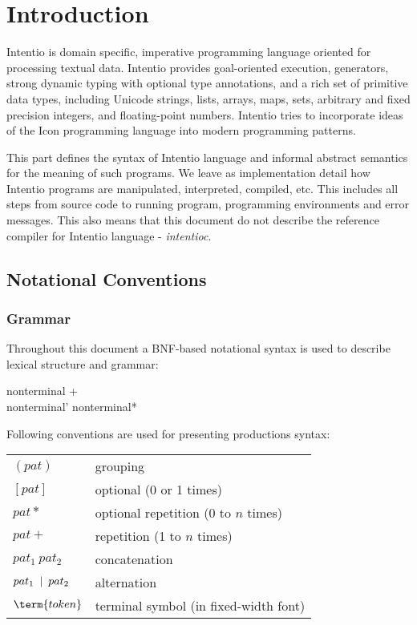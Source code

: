 \chapter{Introduction}

Intentio is domain specific, imperative programming language oriented for processing textual data. Intentio provides goal-oriented execution, generators, strong dynamic typing with optional type annotations, and a rich set of primitive data types, including Unicode strings, lists, arrays, maps, sets, arbitrary and fixed precision integers, and floating-point numbers. Intentio tries to incorporate ideas of the Icon\cite{TheIconProgrammingLanguage} programming language into modern programming patterns.

This part defines the syntax of Intentio language and informal abstract semantics for the meaning of such programs. We leave as implementation detail how Intentio programs are manipulated, interpreted, compiled, etc. This includes all steps from source code to running program, programming environments and error messages. This also means that this document do not describe the reference compiler for Intentio language - \emph{intentioc}\cite{intentioc}.


\section{Notational Conventions}

\subsection*{Grammar}

Throughout this document a BNF-based notational syntax is used to describe lexical structure and grammar:

\begin{bnf}
  nonterminal  \eq {} \gor {}+ \\
  nonterminal' \eq nonterminal*
\end{bnf}

Following conventions are used for presenting productions syntax:

\begin{bnfutils}
\begin{center}
\begin{tabular}[t]{ll}
  \((pat)\)            & grouping \\
  \([pat]\)            & optional (0 or 1 times) \\
  \(pat*\)             & optional repetition (0 to \(n\) times) \\
  \(pat+\)             & repetition (1 to \(n\) times) \\
  \(pat_1 \ pat_2\)    & concatenation \\
  \(pat_1 \hskip0.5em\relax | \hskip0.5em\relax pat_2\) & alternation \\
  \(\term{token}\)     & terminal symbol (in fixed-width font)
\end{tabular}
\end{center}
\end{bnfutils}

